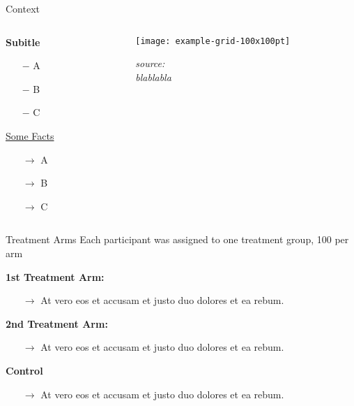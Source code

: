 \documentclass[compress, aspectratio=169, xcolor=dvipsnames]{beamer}
\begin{document}
\begin{frame}{Context}

\begin{columns}
\begin{column}{0.6\textwidth}

\textbf{Subitle}
\begin{itemize}
	\item[$-$] A
	\item[$-$] B
	\item[$-$] C
\end{itemize}

\vspace{5pt}
\underline{Some Facts}
\begin{itemize}
	\item[$\rightarrow$] A
	\item[$\rightarrow$] B
	\item[$\rightarrow$] C
\end{itemize}
	
\end{column}

\begin{column}{0.3\textwidth}  %
    \begin{center}
     \texttt{[image: example-grid-100x100pt]}
     
     \scriptsize{\textit{source: \\ blablabla}}
     \end{center}
\end{column}
\end{columns}
	
\end{frame}

\begin{frame}{Treatment Arms}
	Each participant was assigned to one treatment group, 100 per arm
	\begin{block}{\textbf{1st Treatment Arm:}} %
		\begin{itemize}
			\item[$\rightarrow$] At vero eos et accusam et justo duo dolores et ea rebum.
		\end{itemize}
	\end{block}
	\begin{block}{\textbf{2nd Treatment Arm:}} %
	\begin{itemize}
		\item[$\rightarrow$] At vero eos et accusam et justo duo dolores et ea rebum.
	\end{itemize}
	\end{block}
	\begin{block}{\textbf{Control}} %
	\begin{itemize}
		\item[$\rightarrow$] At vero eos et accusam et justo duo dolores et ea rebum.
	\end{itemize}
	\end{block}

\end{frame}
\end{document}
